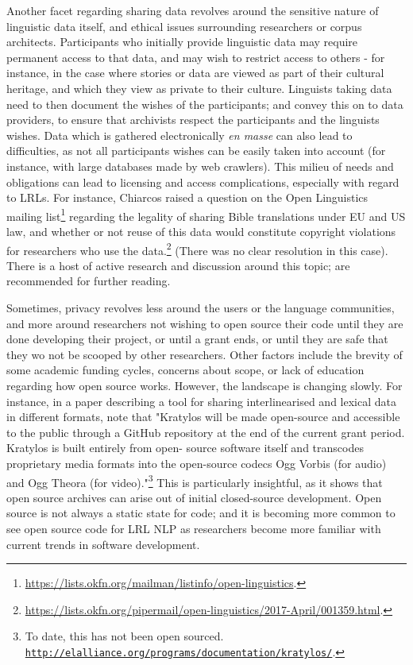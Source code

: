Another facet regarding sharing data revolves around the sensitive nature of linguistic data itself, and ethical issues surrounding researchers or corpus architects. Participants who initially provide linguistic data may require permanent access to that data, and may wish to restrict access to others - for instance, in the case where stories or data are viewed as part of their cultural heritage, and which they view as private to their culture. Linguists taking data need to then document the wishes of the participants; and convey this on to data providers, to ensure that archivists respect the participants and the linguists wishes. Data which is gathered electronically {\it en masse} can  also lead to difficulties, as not all participants wishes can be easily taken into account (for instance, with large databases made by web crawlers). This milieu of needs and obligations can lead to licensing and access complications, especially with regard to LRLs. For instance, Chiarcos raised a question on the Open Linguistics mailing list\footnote{\href{https://lists.okfn.org/mailman/listinfo/open-linguistics}{https://lists.okfn.org/mailman/listinfo/open-linguistics}. } regarding the legality of sharing Bible translations under EU and US law, and whether or not reuse of this data would constitute copyright violations for researchers who use the data.\footnote{\href{https://lists.okfn.org/pipermail/open-linguistics/2017-April/001359.html}{https://lists.okfn.org/pipermail/open-linguistics/2017-April/001359.html}. } (There was no clear resolution in this case). There is a host of active research and discussion around this topic; \citet{liberman2000legal, newman2007copyright, rice2006ethical, austin2010communities, o2010ethical, cushman2013wampum} are recommended for further reading.

Sometimes, privacy revolves less around the users or the language communities, and more around researchers not wishing to open source their code until they are done developing their project, or until a grant ends, or until they are safe that they wo not be scooped by other researchers. Other factors include the brevity of some academic funding cycles, concerns about scope, or lack of education regarding how open source works. However, the landscape is changing slowly. For instance, in a paper describing a tool for sharing interlinearised and lexical data in different formats, \citet[132]{kaufman2018kratylos} note that "Kratylos will be made open-source and accessible to the public through a GitHub repository at the end of the current grant period. Kratylos is built entirely from open- source software itself and transcodes proprietary media formats into the open-source codecs Ogg Vorbis (for audio) and Ogg Theora (for video)."\footnote{To date, this has not been open sourced. \href{http://elalliance.org/programs/documentation/kratylos/}{\nolinkurl{http://elalliance.org/programs/documentation/kratylos/}}. } This is particularly insightful, as it shows that open source archives can arise out of initial closed-source development. Open source is not always a static state for code; and it is becoming more common to see open source code for LRL NLP as researchers become more familiar with current trends in software development.

